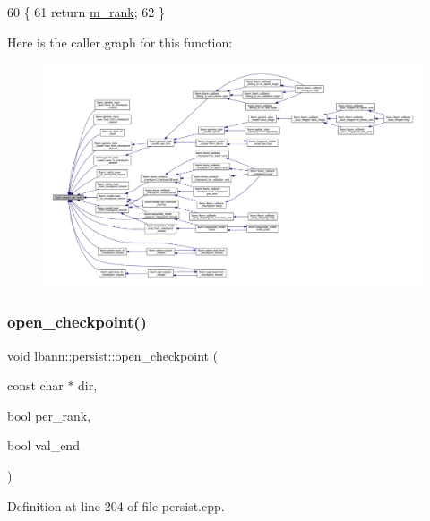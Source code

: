 \begin{DoxyCode}
60                        \{
61     \textcolor{keywordflow}{return} \hyperlink{classlbann_1_1persist_aa99b1b0079bb10471472bf6f1d966deb}{m\_rank};
62   \}
\end{DoxyCode}
Here is the caller graph for this function\+:\nopagebreak
\begin{figure}[H]
\begin{center}
\leavevmode
\includegraphics[width=350pt]{classlbann_1_1persist_a34eb918a890ab49dcbeedddf27ec1616_icgraph}
\end{center}
\end{figure}
\mbox{\label{classlbann_1_1persist_a32a8f71995b674a62b21087ec4be9575}} 
\subsubsection{\texorpdfstring{open\+\_\+checkpoint()}{open\_checkpoint()}}
{\footnotesize\ttfamily void lbann\+::persist\+::open\+\_\+checkpoint (\begin{DoxyParamCaption}\item[{const char $\ast$}]{dir,  }\item[{bool}]{per\+\_\+rank,  }\item[{bool}]{val\+\_\+end }\end{DoxyParamCaption})}



Definition at line 204 of file persist.\+cpp.


